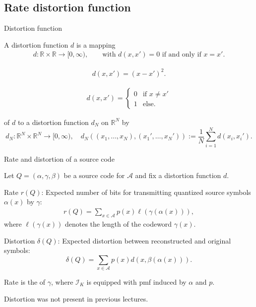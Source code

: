 \subsection{Rate distortion function}
\begin{frame}{Distortion function}
\bit
\item A distortion function $d$ is a mapping
\begin{align*}
d: \mathbb{R}\times\mathbb{R}\to [0,\infty), \qquad \text {with $d(x,x')=0$ if and only if $x=x'$}.
\end{align*}
\item {} 
\begin{align*}
d(x,x')=(x-x')^2.
\end{align*}
\item {}
\begin{align*}
d(x,x')=\begin{cases} 0 & \text{if $x\neq x'$} \\ 1 & \text{else.}  \end{cases}
\end{align*}
\item {} of $d$ to a distortion function $d_N$ on $\mathbb{R}^N$ by   
\[
d_N:\mathbb{R}^N\times\mathbb{R}^N\to [0,\infty),\quad d_N((x_1,\dots,x_N),(x_1',\dots,x_N')):=\frac{1}{N}\sum_{i=1}^Nd(x_i,x_i'). 
\]
\eit 
\end{frame}

\begin{frame}{Rate and distortion of a source code}
\begin{definition}
Let $Q=(\alpha,\gamma,\beta)$ be a source code for $\mathcal{A}$ 
and fix a distortion function $d$. 
\bit
\item Rate $r(Q)$: Expected number of bits for transmitting 
quantized source symbols $\alpha(x)$ 
by $\gamma$:  
\begin{align*}
r(Q)=\sum_{x\in\mathcal{A}}p(x)\ell(\gamma(\alpha(x))),
\end{align*}
where $\ell(\gamma(x))$ denotes the length of the codeword $\gamma(x)$.
\item Distortion $\delta(Q)$: Expected distortion between reconstructed and original symbols:
\[
\delta(Q)=\sum_{x\in\mathcal{A}}p(x)d(x,\beta(\alpha(x))). 
\]
\eit 
\end{definition}
\bit
\item Rate is the  of $\gamma$, where $\mathcal{I}_K$ is equipped with pmf induced by $\alpha$ and $p$. 
\item Distortion was not present in previous lectures.
\eit  
\end{frame}


